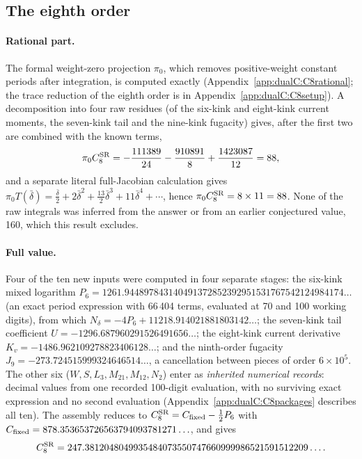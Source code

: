 \documentclass[11pt,a4paper]{article}
\numberwithin{equation}{section}
\newcommand{\CSR}{C^{\rm SR}}
\newcommand{\db}{\bar\delta}
\begin{document}
\subsection{The eighth order}\label{sec:C8}
\paragraph{Rational part.} The formal weight-zero projection $\pi_0$, which removes positive-weight constant periods
after integration, is computed exactly (Appendix~\ref{app:dualC:C8rational}; the trace reduction of the eighth order
is in Appendix~\ref{app:dualC:C8setup}). A decomposition into four raw residues (of the six-kink and eight-kink current
moments, the seven-kink tail and the nine-kink fugacity) gives, after the first two are combined with the known terms,
\begin{equation}
 \pi_0\CSR_8=-\frac{111389}{24}-\frac{910891}{8}+\frac{1423087}{12}=88,
\end{equation}
and a separate literal full-Jacobian calculation gives $\pi_0T(\db)=\frac{\db}2+2\db^2+\frac{13}2\db^3+11\db^4+\cdots$,
hence $\pi_0\CSR_8=8\times11=88$. None of the raw integrals was inferred from the answer or from an earlier
conjectured value, 160, which this result excludes.

\paragraph{Full value.} Four of the ten new inputs were computed in four separate stages: the six-kink mixed logarithm
$P_6=1261.944897843140491372852392951531767542124984174\ldots$ (an exact period expression with 66\,404 terms,
evaluated at 70 and 100 working digits), from which $N_\delta=-4P_6+11218.914021881803142\ldots$; the seven-kink
tail coefficient $U=-1296.687960291526491656\ldots$; the eight-kink current derivative
$K_v=-1486.962109278823406128\ldots$; and the ninth-order fugacity $J_9=-273.724515999324646514\ldots$, a
cancellation between pieces of order $6\times10^5$. The other six ($W,S,L_3,M_{21},M_{12},N_2$) enter as
\emph{inherited numerical records}: decimal values from one recorded 100-digit evaluation, with no surviving exact
expression and no second evaluation (Appendix~\ref{app:dualC:C8packages} describes all ten). The assembly reduces to $\CSR_8=C_{\rm fixed}-\frac12P_6$ with
$C_{\rm fixed}=878.353653726563794093781271\ldots$, and gives
\begin{equation}
 \CSR_8=247.3812048049935484073550747660999986521591512209\ldots .
 \label{eq:C8num}
\end{equation}
\end{document}
